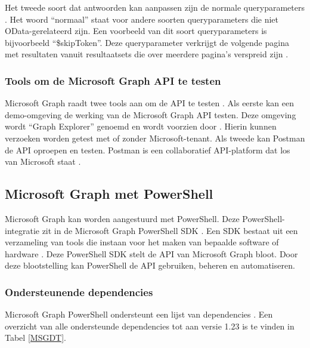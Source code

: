 Het tweede soort dat antwoorden kan aanpassen zijn de normale queryparameters \autocite{Microsoft2023vv}. Het woord “normaal” staat voor andere soorten queryparameters die niet OData-gerelateerd zijn. Een voorbeeld van dit soort queryparameters is bijvoorbeeld “\$skipToken”. Deze queryparameter verkrijgt de volgende pagina met resultaten vanuit resultaatsets die over meerdere pagina's verspreid zijn \textcite{Microsoft2023g}. 

\subsubsection{Tools om de Microsoft Graph API te testen}


Microsoft Graph raadt twee tools aan om de \Ac{API} te testen \autocite{Microsoft2023vv}. Als eerste kan een demo-omgeving de werking van de Microsoft Graph \Ac{API} testen. Deze omgeving wordt “Graph Explorer” genoemd en wordt voorzien door \textcite{Microsoft2023h}. Hierin kunnen verzoeken worden getest met of zonder Microsoft-tenant. Als tweede kan Postman de \Ac{API} oproepen en testen. Postman is een collaboratief \ac{API}-platform dat los van Microsoft staat \autocite{Postman2023}.

\subsection{Microsoft Graph met PowerShell}


Microsoft Graph kan worden aangestuurd met PowerShell. Deze PowerShell-integratie zit in de Microsoft Graph PowerShell \ac{SDK} \autocite{Microsoft2023j}. Een \ac{SDK} bestaat uit een verzameling van tools die instaan voor het maken van bepaalde software of hardware \autocite{RedHat2020}. Deze PowerShell \ac{SDK} stelt de \ac{API} van Microsoft Graph bloot. Door deze blootstelling kan PowerShell de \ac{API} gebruiken, beheren en automatiseren.


\subsubsection{Ondersteunende dependencies}


Microsoft Graph PowerShell ondersteunt een lijst van dependencies \autocite{Microsoft2023k}. Een overzicht van alle ondersteunde dependencies tot aan versie 1.23 is te vinden in Tabel \ref{MSGDT}. 

